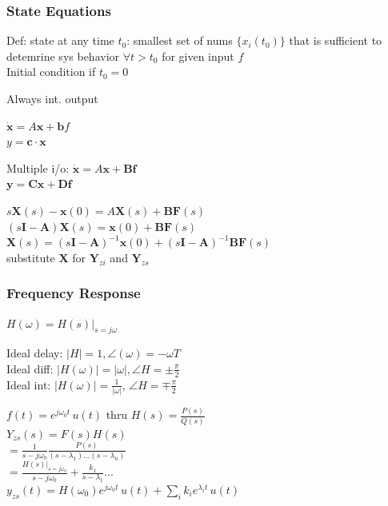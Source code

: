 \documentclass[4pt]{article}
\theoremstyle{definition}
\theoremstyle{definition}
\renewcommand{\o}{\omega}
\begin{document}
\begin{landscape}
\begin{multicols}{3}
\columnbreak
\subsubsection*{State Equations}
    Def: state at any time $t_0$: smallest set of nums $\{x_i(t_0)\}$ that is sufficient to detemrine sys behavior $\forall t > t_0$ for given input $f$\\
    Initial condition if $t_0 = 0$

    Always int. output

    \(\mathbf{\dot x} = A \mathbf x + \mathbf b f\)\\
    \(y = \mathbf{c} \cdot \mathbf x\)

    Multiple i/o:
    \(\mathbf{\dot x} = A \mathbf x + \mathbf B \mathbf f\)\\
    \(\mathbf y = \mathbf C \mathbf x + \mathbf D \mathbf f\)

    \(s \mathbf X(s) - \mathbf x(0) = A \mathbf X(s) + \mathbf B \mathbf F(s)\)\\
    \((s \mathbf I - \mathbf A) \mathbf X(s) = \mathbf x(0) + \mathbf B \mathbf F(s)\)\\
    \(\mathbf X(s) = (s \mathbf I - \mathbf A)^{-1} \mathbf x(0) + (s \mathbf I - \mathbf A)^{-1} \mathbf B \mathbf F(s)\)\\
    substitute $\mathbf X$ for $\mathbf Y_{zi}$ and $\mathbf Y_{zs}$
    



\subsubsection*{Frequency Response}
    \(H(\o) = H(s)|_{s = j\o}\) %

    Ideal delay: \(|H| = 1, \angle(\o) = -\o T\)\\      %
    Ideal diff: \(|H(\o)| = |\o|, \angle H = \pm\frac {\pi} 2\)\\
    Ideal int: \(|H(\o)| = \frac 1 {|\o|}\), \(\angle H = \mp \frac{\pi} 2\)

    \(f(t) = e^{j\o_0 t}\, u(t)\) thru \(H(s) = \frac{P(s)}{Q(s)}\)\\   %
    \(Y_{zs}(s) = F(s) H(s)\)\\      %
    \(= \frac 1 {s - j\o_0} \frac{P(s)}{(s-\lambda_1)...(s-\lambda_n)}\)\\
    \(= \frac{H(s)|_{s=j\o_0}}{s-j\o_0} + \frac{k_1}{s-\lambda_1} ...\)\\
    \(y_{zs}(t) = H(\o_0)  e^{j\o_0 t} \, u(t) + \sum_i k_i e^{\lambda_i t} \, u(t)\)


\end{multicols}
\end{landscape}
\end{document}
